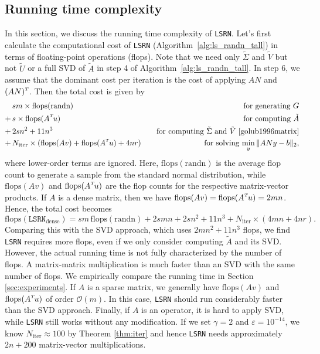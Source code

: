 \documentclass{siamltex}
\newcommand{\T}{^{\raisebox{0.09em}{\hbox{\tiny $T$}}\hspace{-0.1em}}}
\begin{document}
\subsection{Running time complexity}
\label{subsec:complexity}

In this section, we discuss the running time complexity of \texttt{LSRN}.  Let's
first calculate the computational cost of \texttt{LSRN}
(Algorithm~\ref{alg:ls_randn_tall}) in terms of floating-point operations
(flops).  Note that we need only $\tilde{\Sigma}$ and $\tilde{V}$ but not
$\tilde{U}$ or a full SVD of $\tilde{A}$ in step 4 of
Algorithm~\ref{alg:ls_randn_tall}. In step 6, we assume that the dominant cost
per iteration is the cost of applying $AN$ and $(AN)\T$. Then the total cost is
given by
\begin{eqnarray*}
  \label{eq:lsrn_flops}
  & s m  \times \text{flops}(\text{randn}) & \quad \text{for generating } G \\ 
  \null + \, & s \times \text{flops}(A\T u) & \quad \text{for computing } \tilde{A} \\
  \null + \, & 2 s n^2 + 11 n^3 & \quad \text{for computing } \tilde{\Sigma} \text{ and }  \tilde{V} \text{ \cite[p.\,254]{golub1996matrix}} \\
  \null + \, & N_{\text{iter}}  \times ( \text{flops}(A v) + \text{flops}(A\T u) + 4 n r) & \quad \text{for solving $\min_y \| A N y - b \|_2$},
\end{eqnarray*}
where lower-order terms are ignored. 
Here, $\text{flops}(\text{randn})$ is the average flop count to generate a 
sample from the standard normal distribution, while $\text{flops}(A v)$ and 
$\text{flops}(A\T u)$ are the flop counts for the respective matrix-vector 
products. 
If $A$ is a dense matrix, then we have 
$\text{flops}( A v ) = \text{flops}( A\T u ) = 2 m n$. 
Hence, the total cost becomes
\begin{equation*}
  \text{flops}(\texttt{LSRN}_{\text{dense}}) = s m \, \text{flops}(\text{randn}) + 2 s m n + 2 s n^2 + 11 n^3 + N_{\text{iter}} \times ( 4 m n + 4 n r ).
\end{equation*}
Comparing this with the SVD approach, which uses $2 m n^2 + 11 n^3$ flops, we
find \texttt{LSRN} requires more flops, even if we only consider computing
$\tilde{A}$ and its SVD.  However, the actual running time is not fully
characterized by the number of flops.  A matrix-matrix multiplication is much
faster than an SVD with the same number of flops.  We empirically compare the
running time in Section \ref{sec:experiments}.  If $A$ is a sparse matrix, we
generally have $\text{flops}(A v)$ and $\text{flops}(A\T u)$ of order
$\mathcal{O}(m)$. In this case, \texttt{LSRN} should run considerably faster
than the SVD approach. Finally, if $A$ is an operator, it is hard to apply SVD,
while \texttt{LSRN} still works without any modification. If we set $\gamma = 2$
and $\varepsilon = 10^{-14}$, we know $N_{\text{iter}} \approx 100$ by Theorem
\ref{thm:iter} and hence \texttt{LSRN} needs approximately $2n + 200$
matrix-vector multiplications.
\end{document}
